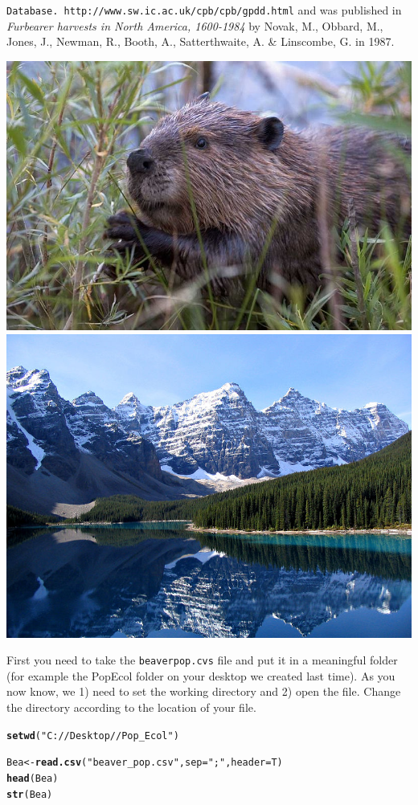 \documentclass{article}\usepackage[]{graphicx}\usepackage[]{color}
\makeatletter
\newcommand{\hlstr}[1]{\textcolor[rgb]{0.192,0.494,0.8}{#1}}%
\newcommand{\hlstd}[1]{\textcolor[rgb]{0.345,0.345,0.345}{#1}}%
\newcommand{\hlkwb}[1]{\textcolor[rgb]{0.69,0.353,0.396}{#1}}%
\newcommand{\hlkwc}[1]{\textcolor[rgb]{0.333,0.667,0.333}{#1}}%
\newcommand{\hlkwd}[1]{\textcolor[rgb]{0.737,0.353,0.396}{\textbf{#1}}}%
\newenvironment{kframe}{%
 \def\at@end@of@kframe{}%
 \ifinner\ifhmode%
  \def\at@end@of@kframe{\end{minipage}}%
  \begin{minipage}{\columnwidth}%
 \fi\fi%
 \def\FrameCommand##1{\hskip\@totalleftmargin \hskip-\fboxsep
 \colorbox{shadecolor}{##1}\hskip-\fboxsep
     \hskip-\linewidth \hskip-\@totalleftmargin \hskip\columnwidth}%
 \MakeFramed {\advance\hsize-\width
   \@totalleftmargin\z@ \linewidth\hsize
   \@setminipage}}%
 {\par\unskip\endMakeFramed%
 \at@end@of@kframe}
\newenvironment{knitrout}{}{} %
\makeatother
\begin{document}
\texttt{Database. http://www.sw.ic.ac.uk/cpb/cpb/gpdd.html} and was published in \textit{Furbearer harvests in North America, 1600-1984} by Novak, M., Obbard, M., Jones, J., Newman, R., Booth, A., Satterthwaite, A. \& Linscombe, G. in 1987.  
\vspace{1.5ex}
\begin{center}
\includegraphics[height=0.35\textwidth]{Beaver.jpg}\includegraphics[height=0.35\textwidth]{Alberta.jpg}
\end{center}

First you need to take the \texttt{beaver\textunderscore pop.cvs} file and put it in a meaningful folder (for example the Pop\textunderscore Ecol folder on your desktop we created last time). As you now know, we 1) need to set the working directory and 2) open the file. Change the directory according to the location of your file.


\begin{knitrout}
\color{fgcolor}\begin{kframe}
\begin{alltt}
\hlkwd{setwd}\hlstd{(}\hlstr{"C://Desktop//Pop_Ecol"}\hlstd{)}
\end{alltt}
\end{kframe}
\end{knitrout}

\begin{knitrout}
\color{fgcolor}\begin{kframe}
\begin{alltt}
\hlstd{Bea}\hlkwb{<-}\hlkwd{read.csv}\hlstd{(}\hlstr{"beaver_pop.csv"}\hlstd{,} \hlkwc{sep}\hlstd{=}\hlstr{";"}\hlstd{,} \hlkwc{header}\hlstd{=T)}
\hlkwd{head}\hlstd{(Bea)}
\hlkwd{str}\hlstd{(Bea)}
\end{alltt}
\end{kframe}
\end{knitrout}
\end{document}
